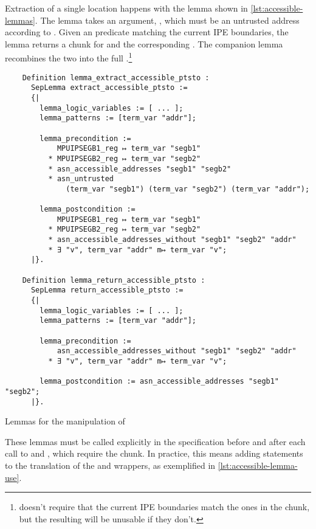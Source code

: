 Extraction of a single location happens with the  lemma shown in \cref{lst:accessible-lemmas}. The lemma takes an argument, , which must be an untrusted address according to . Given an  predicate matching the current IPE boundaries, the lemma returns a  chunk for  and the corresponding . The companion lemma  recombines the two into the full .\footnote{ doesn't require that the current IPE boundaries match the ones in the  chunk, but the resulting  will be unusable if they don't.}

\begin{listing}[p]
  \begin{verbatim}
    Definition lemma_extract_accessible_ptsto :
      SepLemma extract_accessible_ptsto :=
      {|
        lemma_logic_variables := [ ... ];
        lemma_patterns := [term_var "addr"];

        lemma_precondition :=
            MPUIPSEGB1_reg ↦ term_var "segb1"
          * MPUIPSEGB2_reg ↦ term_var "segb2"
          * asn_accessible_addresses "segb1" "segb2"
          * asn_untrusted
              (term_var "segb1") (term_var "segb2") (term_var "addr");

        lemma_postcondition :=
            MPUIPSEGB1_reg ↦ term_var "segb1"
          * MPUIPSEGB2_reg ↦ term_var "segb2"
          * asn_accessible_addresses_without "segb1" "segb2" "addr"
          * ∃ "v", term_var "addr" m↦ term_var "v";
      |}.

    Definition lemma_return_accessible_ptsto :
      SepLemma return_accessible_ptsto :=
      {|
        lemma_logic_variables := [ ... ];
        lemma_patterns := [term_var "addr"];

        lemma_precondition :=
            asn_accessible_addresses_without "segb1" "segb2" "addr"
          * ∃ "v", term_var "addr" m↦ term_var "v";

        lemma_postcondition := asn_accessible_addresses "segb1" "segb2";
      |}.
  \end{verbatim}
  \caption{Lemmas for the manipulation of }
  \label{lst:accessible-lemmas}
\end{listing}

These lemmas must be called explicitly in the \usail specification before and after each call to  and , which require the  chunk. In practice, this means adding  statements to the translation of the  and  wrappers, as exemplified in \cref{lst:accessible-lemma-use}.

